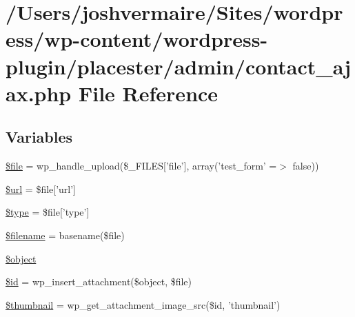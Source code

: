 \hypertarget{contact__ajax_8php}{
\section{/Users/joshvermaire/Sites/wordpress/wp-\/content/wordpress-\/plugin/placester/admin/contact\_\-ajax.php File Reference}
\label{d6/d22/contact__ajax_8php}
}
\subsection*{Variables}
\begin{DoxyCompactItemize}
\item 
\hyperlink{contact__ajax_8php_aa1bfbd27060176201b271918dff57e8f}{\$file} = wp\_\-handle\_\-upload(\$\_\-FILES\mbox{[}'file'\mbox{]}, array('test\_\-form' =$>$ false))
\item 
\hyperlink{contact__ajax_8php_acf215f34a917d014776ce684a9ee8909}{\$url} = \$file\mbox{[}'url'\mbox{]}
\item 
\hyperlink{contact__ajax_8php_a9a4a6fba2208984cabb3afacadf33919}{\$type} = \$file\mbox{[}'type'\mbox{]}
\item 
\hyperlink{contact__ajax_8php_a0722441477f957078ee2437054556cbc}{\$filename} = basename(\$file)
\item 
\hyperlink{contact__ajax_8php_a52123b83a1952a68c5513e47d59ec4a6}{\$object}
\item 
\hyperlink{contact__ajax_8php_ae97941710d863131c700f069b109991e}{\$id} = wp\_\-insert\_\-attachment(\$object, \$file)
\item 
\hyperlink{contact__ajax_8php_a7f835c9ddb57cb4a7f20c89382f45dab}{\$thumbnail} = wp\_\-get\_\-attachment\_\-image\_\-src(\$id, 'thumbnail')
\end{DoxyCompactItemize}


